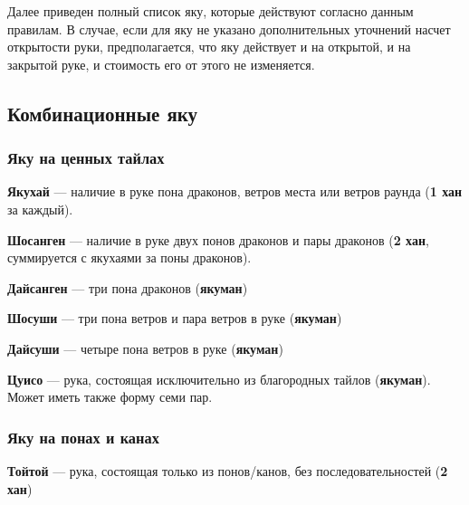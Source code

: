 Далее приведен полный список яку, которые действуют согласно данным правилам. В случае, если для яку не указано дополнительных уточнений насчет открытости руки, предполагается, что яку действует и на открытой, и на закрытой руке, и стоимость его от этого не изменяется.

\subsection{Комбинационные яку}

\subsubsection{Яку на ценных тайлах}

\textbf{Якухай} --- наличие в руке пона драконов, ветров места или ветров раунда (\textbf{1 хан} за каждый).

 \hfill {}

\textbf{Шосанген} --- наличие в руке двух понов драконов и пары драконов (\textbf{2 хан}, суммируется с якухаями за поны драконов).

 \hfill {}

\textbf{Дайсанген} --- три пона драконов (\textbf{якуман})

 \hfill {}

\textbf{Шосуши} --- три пона ветров и пара ветров в руке (\textbf{якуман})

 \hfill {}

\textbf{Дайсуши} --- четыре пона ветров в руке (\textbf{якуман})

 \hfill {}

\textbf{Цуисо} --- рука, состоящая исключительно из благородных тайлов (\textbf{якуман}). Может иметь также форму семи пар.

 \hfill {}

\subsubsection{Яку на понах и канах}

\textbf{Тойтой} --- рука, состоящая только из понов/канов, без последовательностей (\textbf{2 хан})

 \hfill {}


